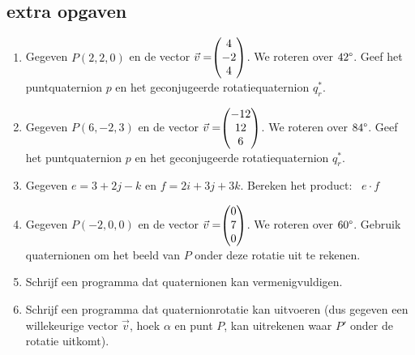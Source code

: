 \subsection{extra opgaven}
\begin{enumerate}
    \setlength{\itemsep}{10pt}
	\item Gegeven $P (2,2,0)$ en de vector $\vec{v} = \vecdrie{4}{-2}{4} $. 
	We roteren over $42\degree$. Geef het puntquaternion $p$ en het geconjugeerde rotatiequaternion $q_r^*$. 
	
	\item Gegeven $ P (6,-2,3)$ en de vector $\vec{v} = \vecdrie{-12}{12}{6} $. 
	We roteren over $ 84\degree$. Geef het puntquaternion $p$ en het geconjugeerde rotatiequaternion  $q_r^*$. 
	
	\item Gegeven $e = 3 +2j-k$ en $f = 2i+3j+3k$. Bereken het product: \ $e\cdot f$
	
	\item  Gegeven $P (-2, 0, 0)$ en de vector $\vec{v} = \vecdrie{0}{7}{0} $. 
	We roteren over $60\degree$. Gebruik quaternionen om het beeld van $P$ onder deze rotatie uit te rekenen. 
	
	\item Schrijf een programma dat quaternionen kan vermenigvuldigen.  
	
	\item Schrijf een programma dat quaternionrotatie kan uitvoeren (dus gegeven een willekeurige vector $\vec{v}$, hoek $\alpha$ en punt $P$, kan uitrekenen waar $P'$ onder de rotatie uitkomt).  
\end{enumerate}
